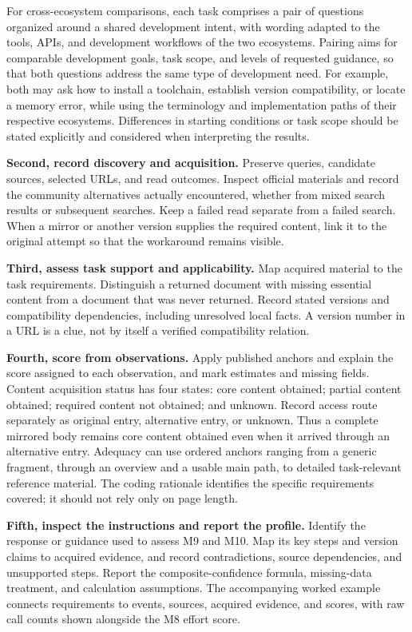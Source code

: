 \documentclass[manuscript,review,anonymous]{acmart}
\begin{document}
For cross-ecosystem comparisons, each task comprises a pair of questions organized around a shared development intent, with wording adapted to the tools, APIs, and development workflows of the two ecosystems. Pairing aims for comparable development goals, task scope, and levels of requested guidance, so that both questions address the same type of development need. For example, both may ask how to install a toolchain, establish version compatibility, or locate a memory error, while using the terminology and implementation paths of their respective ecosystems. Differences in starting conditions or task scope should be stated explicitly and considered when interpreting the results.

\textbf{Second, record discovery and acquisition.} Preserve queries, candidate sources, selected URLs, and read outcomes. Inspect official materials and record the community alternatives actually encountered, whether from mixed search results or subsequent searches. Keep a failed read separate from a failed search. When a mirror or another version supplies the required content, link it to the original attempt so that the workaround remains visible.

\textbf{Third, assess task support and applicability.} Map acquired material to the task requirements. Distinguish a returned document with missing essential content from a document that was never returned. Record stated versions and compatibility dependencies, including unresolved local facts. A version number in a URL is a clue, not by itself a verified compatibility relation.

\textbf{Fourth, score from observations.} Apply published anchors and explain the score assigned to each observation, and mark estimates and missing fields. Content acquisition status has four states: core content obtained; partial content obtained; required content not obtained; and unknown. Record access route separately as original entry, alternative entry, or unknown. Thus a complete mirrored body remains core content obtained even when it arrived through an alternative entry. Adequacy can use ordered anchors ranging from a generic fragment, through an overview and a usable main path, to detailed task-relevant reference material. The coding rationale identifies the specific requirements covered; it should not rely only on page length.

\textbf{Fifth, inspect the instructions and report the profile.} Identify the response or guidance used to assess M9 and M10. Map its key steps and version claims to acquired evidence, and record contradictions, source dependencies, and unsupported steps. Report the composite-confidence formula, missing-data treatment, and calculation assumptions. The accompanying worked example connects requirements to events, sources, acquired evidence, and scores, with raw call counts shown alongside the M8 effort score.
\end{document}
